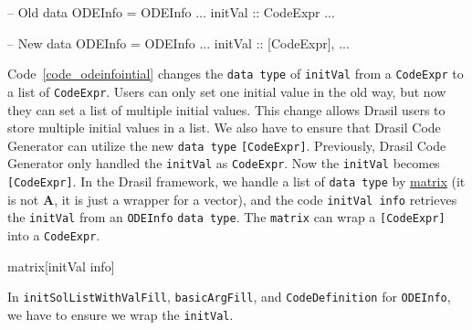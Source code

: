 \begin{listing}[ht]
\begin{haskell1}
-- Old 
data ODEInfo = ODEInfo {
  ...
  initVal :: CodeExpr
  ...
}

-- New 
data ODEInfo = ODEInfo {
  ...
  initVal :: [CodeExpr],
  ...
}
\end{haskell1}
\label{code_odeinfointial}
\end{listing}
Code~\ref{code_odeinfointial} changes the \verb|data type| of \verb|initVal| from a \verb|CodeExpr| to a list of \verb|CodeExpr|. Users can only set one initial value in the old way, but now they can set a list of multiple initial values. This change allows Drasil users to store multiple initial values in a list. We also have to ensure that Drasil Code Generator can utilize the new \verb|data type| \verb|[CodeExpr]|. Previously, Drasil Code Generator only handled the \verb|initVal| as \verb|CodeExpr|. Now the \verb|initVal| becomes \verb|[CodeExpr]|. In the Drasil framework, we handle a list of \verb|data type| by \href{https://jacquescarette.github.io/Drasil/docs/drasil-code-base-0.1.9.0/Language-Drasil-CodeExpr.html#v:matrix}{matrix} (it is not $\boldsymbol{A}$, it is just a wrapper for a vector), and the code \verb|initVal info| retrieves the \verb|initVal| from an \verb|ODEInfo| \verb|data type|. The \verb|matrix| can wrap a \verb|[CodeExpr]| into a \verb|CodeExpr|. 

\begin{listing}[ht]
\begin{haskell1}
matrix[initVal info]
\end{haskell1}
\end{listing}

In \verb|initSolListWithValFill|, \verb|basicArgFill|, and \verb|CodeDefinition| for \verb|ODEInfo|, we have to ensure we wrap the \verb|initVal|.




